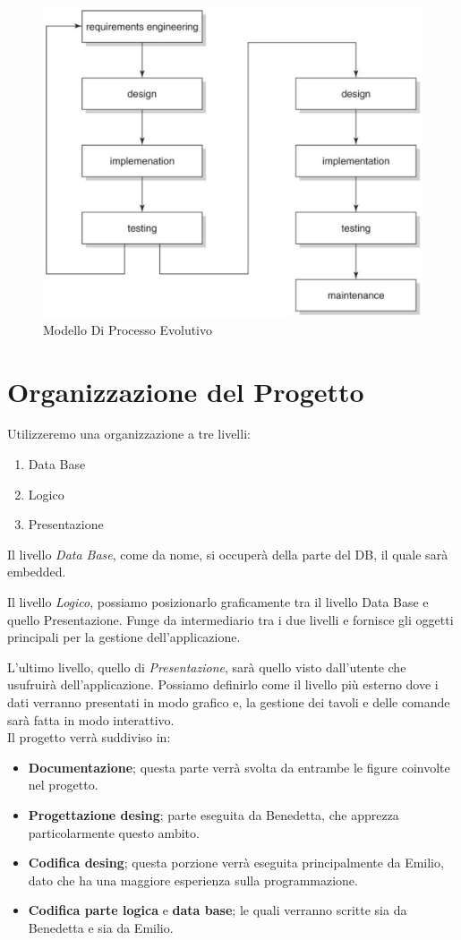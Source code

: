 \documentclass[12pt, letterpaper]{book}
\begin{document}
\begin{figure}[h]
    \centering
    \includegraphics[width = 0.7\linewidth]{../../Immagini/Modello_Processo_Evolutivo.jpg}
    \caption{Modello Di Processo Evolutivo}
    \label{fig: modello_processo_evolutivo}
\end{figure}

\section{Organizzazione del Progetto}\label{sez: organizzazioneProgetto}

Utilizzeremo una organizzazione a tre livelli:

\begin{enumerate}
    \item Data Base
    \item Logico
    \item Presentazione
\end{enumerate}
Il livello \textit{Data Base}, come da nome, si occuperà della parte del DB, il quale sarà embedded.

Il livello \textit{Logico}, possiamo posizionarlo graficamente tra il livello Data Base e quello Presentazione. Funge da intermediario tra i due livelli e fornisce gli oggetti principali per la gestione dell'applicazione.

L'ultimo livello, quello di \textit{Presentazione}, sarà quello visto dall'utente che usufruirà dell'applicazione. Possiamo definirlo come il livello più esterno dove i dati verranno presentati in modo grafico e, la gestione dei tavoli e delle comande sarà fatta in modo interattivo.\\

Il progetto verrà suddiviso in:
\begin{itemize}
    \item \textbf{Documentazione}; questa parte verrà svolta da entrambe le figure coinvolte nel progetto.
    \item \textbf{Progettazione desing}; parte eseguita da Benedetta, che apprezza particolarmente questo ambito.
    \item \textbf{Codifica desing}; questa porzione verrà eseguita principalmente da Emilio, dato che ha una maggiore esperienza sulla programmazione.
    \item \textbf{Codifica parte logica} e \textbf{data base}; le quali verranno scritte sia da Benedetta e sia da Emilio.
\end{itemize}
\end{document}

